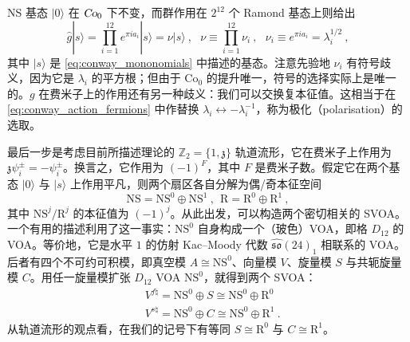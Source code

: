 \documentclass[11pt,a4paper,fontset=windows]{ctexart}
\numberwithin{equation}{section}
\newcommand{\SO}{\operatorname{\textsl{SO}}}      %
\newcommand{\Co}{\operatorname{\textsl{Co}}}      %
\newcommand{\ZZ}{\mathbb{Z}}
\begin{document}

NS 基态 $|0\rangle$ 在 $\Co_0$ 下不变，而群作用在 $2^{12}$ 个 Ramond 基态上则给出
\begin{equation}
\hat{g}|s\rangle=\prod_{i=1}^{12}e^{\pi i a_i}|s\rangle=\nu|s\rangle~,~~~\nu\equiv\prod_{i=1}^{12}\nu_i~,~~~\nu_i\equiv e^{\pi ia_i}=\lambda_i^{1/2}~,
\end{equation}
其中 $|s\rangle$ 是 \eqref{eq:conway_mononomials} 中描述的基态。注意先验地 $\nu_i$ 有符号歧义，因为它是 $\lambda_i$ 的平方根；但由于 $\text{Co}_0$ 的提升唯一，符号的选择实际上是唯一的。$g$ 在费米子上的作用还有另一种歧义：我们可以交换复本征值。这相当于在 \eqref{eq:conway_action_fermions} 中作替换 $\lambda_i\leftrightarrow-\lambda_i^{-1}$，称为极化（polarisation）的选取。


最后一步是考虑目前所描述理论的 $\ZZ_2=\lbrace1,\mathfrak{z}\rbrace$ 轨道流形，它在费米子上作用为 $\mathfrak{z}\psi^\pm_i=-\psi^\pm_i$。换言之，它作用为 $(-1)^F$，其中 $F$ 是费米子数。假定它在两个基态 $|0\rangle$ 与 $|s\rangle$ 上作用平凡\cite{DuncanJohnf.r.2015TMMF}，则两个扇区各自分解为偶/奇本征空间
\begin{equation}
\text{NS}=\text{NS}^0\oplus\text{NS}^1~,~~\text{R}=\text{R}^0\oplus\text{R}^1~,
\end{equation}
其中 $\text{NS}^j/\text{R}^j$ 的本征值为 $(-1)^j$。从此出发，可以构造两个密切相关的 SVOA。一个有用的描述利用了这一事实：$\text{NS}^0$ 自身构成一个（玻色）VOA，即格 $D_{12}$ 的 VOA。等价地，它是水平 $1$ 的仿射 Kac–Moody 代数 $\widehat{\mathfrak{so}}(24)_1$ 相联系的 VOA。后者有四个不可约可积模，即真空模 $A\cong\text{NS}^0$、向量模 $V$、旋量模 $S$ 与共轭旋量模 $C$。用任一旋量模扩张 $D_{12}$ VOA $\text{NS}^0$，就得到两个 SVOA：
\begin{equation}
\label{eq:Vf,Vs}
\begin{split}
&V^{f\natural}=\text{NS}^0\oplus S\cong\text{NS}^0\oplus \text{R}^0 \\
&V^{s\natural}=\text{NS}^0\oplus C\cong\text{NS}^0\oplus \text{R}^1~. 
\end{split}
\end{equation}
从轨道流形的观点看，在我们的记号下有等同 $S\cong\text{R}^0$ 与 $C\cong\text{R}^1$。
\end{document}
